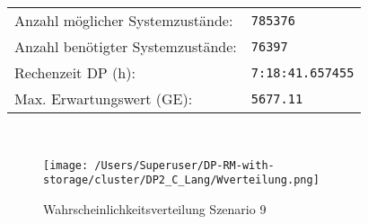 \begin{table}[h!]
\begin{center}
\begin{tabular}{p{7cm}p{5cm}}
     Anzahl möglicher Systemzustände: & \texttt{785376} \\
     Anzahl benötigter Systemzustände: & \texttt{76397} \\ 
     Rechenzeit DP (h): & \texttt{7:18:41.657455} \\ 
          Max. Erwartungswert (GE): & \texttt{5677.11} \\ \hline
         \end{tabular} \\[3mm]
  \end{center}
\end{table}

\begin{figure}[h!]
  \begin{center}
    \texttt{[image: /Users/Superuser/DP-RM-with-storage/cluster/DP2\_C\_Lang/Wverteilung.png]}
    \caption{Wahrscheinlichkeitsverteilung Szenario 9}  \label{SB9}
  \end{center}
\end{figure}

